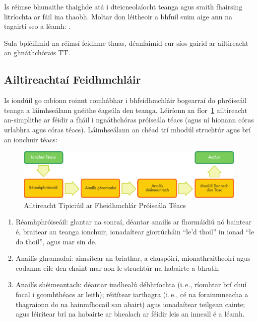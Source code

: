 \begin{multicols}{2}
Is réimse bhunaithe thaighde atá i dteicneolaíocht teanga agus sraith fhairsing litríochta ar fáil ina thaobh. Moltar don léitheoir a bhfuil suim aige ann na tagairtí seo a léamh: \cite{carstensen-etal1,jurafsky-martin01,manning-schuetze1,lt-world1,lt-survey1}. 

Sula bpléifimid na réimsí feidhme thuas, déanfaimid cur síos gairid ar ailtireacht an ghnáthchórais TT.

\subsection{Ailtireachtaí Feidhmchláir}

Is iondúil go mbíonn roinnt comhábhar i bhfeidhmchláir bogearraí do phróiseáil teanga a láimhseálann gnéithe éagsúla den teanga. Léiríonn an fíor~\ref{fig:textprocessingarch_de} ailtireacht an-simplithe ar féidir a fháil i ngnáthchóras próiseála téacs (agus ní hionann córas urlabhra agus córas téacs). Láimhseálann an chéad trí mhodúl struchtúr agus brí an ionchuir téacs:

\begin{figure}[hb]
  \center
  \includegraphics[width=\textwidth]{../_media/irish/text_processing_app_architecture}
  \caption{Ailtireacht Tipiciúil ar Fheidhmchlár Próiseála Téacs}
  \label{fig:textprocessingarch_de}
\end{figure}

\begin{enumerate}
\item Réamhphróiseáil: glantar na sonraí, déantar anailís ar fhormáidiú nó baintear é, braitear an teanga ionchuir, ionadaítear giorrúcháin ``le'd thoil'' in ionad ``le do thoil'', agus mar sin de.
\item Anailís ghramadaí: aimsítear an briathar, a chuspóirí, mionathraitheoirí agus codanna eile den chaint mar aon le struchtúr na habairte a bhrath.
\item Anailís shéimeantach: déantar imdhealú débhríochta (i.\,e., ríomhtar brí chuí focal i gcomhthéacs ar leith); réitítear iarthagra (i.\,e., cé na forainmneacha a thagraíonn do na hainmfhocail san abairt) agus ionadaítear teilgean cainte; agus léirítear brí na habairte ar bhealach ar féidir leis an inneall é a léamh.
\end{enumerate}


\end{multicols}
